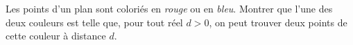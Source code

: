 Les points d'un plan sont coloriés en \emph{rouge} ou en \emph{bleu}. Montrer que l'une des deux couleurs est telle que, pour tout réel $d > 0$, on peut trouver deux points de cette couleur à distance $d$.
